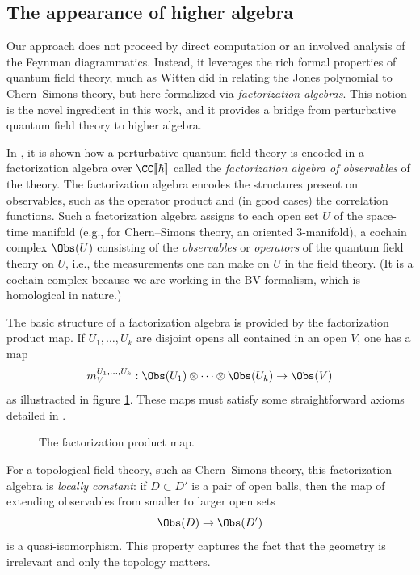 \documentclass[10pt]{amsart}
\begin{document}
\subsection{The appearance of higher algebra}

Our approach does not proceed by direct computation or an involved analysis of the Feynman diagrammatics.
Instead, it leverages  the rich formal properties of quantum field theory,
much as Witten did in relating the Jones polynomial to Chern--Simons theory,
but here formalized via {\em factorization algebras}.
This notion is the novel ingredient in this work,
and it provides a bridge from perturbative quantum field theory to higher algebra.

In \cite{CG1,CG2}, it is shown how a perturbative quantum field theory is encoded in a factorization algebra over $\CC[\![\hbar]\!]$  called the {\it factorization algebra of observables} of the theory.  
The factorization algebra encodes the structures present on observables, such as the operator product and (in good cases) the correlation functions.
Such a factorization algebra assigns to each open set $U$ of the space-time manifold 
(e.g., for Chern--Simons theory, an oriented 3-manifold),
a cochain complex $\Obs(U)$ consisting of the \emph{observables} or \emph{operators} of the quantum field theory on $U$, i.e., the measurements one can make on $U$ in the field theory.
(It is a cochain complex because we are working in the BV formalism,
which is homological in nature.)

The basic structure of a factorization algebra is provided by the factorization product map. If $U_1,\dots,U_k$ are disjoint opens all contained in an open $V$, one has a map
\begin{equation} 
	 m_V^{U_1,\ldots,U_k}: \Obs(U_1)\otimes\cdots\otimes\Obs(U_k)\to\Obs(V)
\end{equation}	
as illustracted in figure \ref{fig:factorization}.  These maps must satisfy some straightforward axioms detailed in \cite{CG1}.
\begin{figure}
\begin{center}
\end{center}
	\caption{ The factorization product map. \label{fig:factorization}}
\end{figure}
For a topological field theory, such as Chern--Simons theory,
this factorization algebra is {\em locally constant}:
if $D \subset D'$ is a pair of open balls,
then the map of extending observables from smaller to larger open sets
\[
\Obs(D) \to \Obs(D')
\]
is a quasi-isomorphism.
This property captures the fact that the geometry is irrelevant and only the topology matters.
\end{document}
